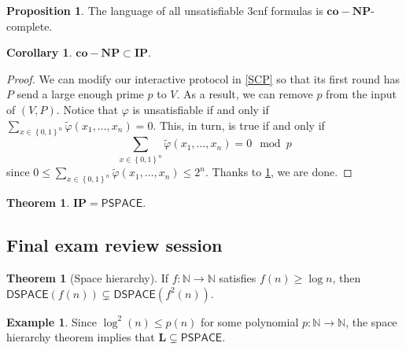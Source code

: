 \documentclass[10pt,letterpaper,cm]{nupset}
\theoremstyle{definition}
\newtheorem{exmp}[definition]{Example}
\theoremstyle{theorem}
\newtheorem{theorem}[definition]{Theorem}
\newtheorem{prop}[definition]{Proposition}
\newtheorem{corollary}[definition]{Corollary}
\theoremstyle{remark}
\newcommand{\N}{\mathbb N}
\newcommand{\1}{\mathbf{1}}
\newcommand{\0}{\vec 0}
\begin{document}
\begin{prop}\label{LP}
The language of all unsatisfiable 3cnf formulas is $\mathbf{co{-}NP}$-complete.
\end{prop}

\begin{corollary}
$\mathbf{co{-}NP} \subset \mathbf{IP}$.
\end{corollary}
\begin{proof}
We can modify our interactive protocol in \cref{SCP} so that its first round has $P$ send a large enough prime $p$ to $V$. As a result, we can remove $p$ from the input of $\left(V, P\right)$. Notice that $\varphi$ is unsatisfiable if and only if $\sum_{x\in \left\{0,1\right\}^n} \tilde{\varphi}(x_1, \ldots, x_n) =0$. This, in turn, is true if and only if  $$ \sum_{x\in \left\{0,1\right\}^n} \tilde{\varphi}(x_1, \ldots, x_n) =0 \mod p$$ since  $0\leq \sum_{x\in \left\{0,1\right\}^n} \tilde{\varphi}(x_1, \ldots, x_n) \leq 2^n$. Thanks to \cref{LP}, we are done. 
\end{proof}

\begin{theorem}
$\mathbf{IP} = \mathsf{PSPACE}$.
\end{theorem}

\subsection{Final exam review session}

\begin{theorem}[Space hierarchy]
If $f: \N \to \N$ satisfies $f(n) \geq \log{n}$, then $\mathsf{DSPACE}(f(n)) \subsetneq \mathsf{DSPACE}(f^2(n))$.
\end{theorem}

\begin{exmp}
 Since $\log^2(n) \leq p(n)$ for some polynomial $p: \N \to \N$, the space hierarchy theorem implies that $\mathbf{L} \subsetneq \mathsf{PSPACE}$.
\end{exmp}
\end{document}
